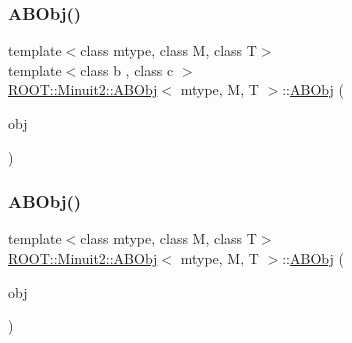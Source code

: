 \subsubsection{\texorpdfstring{ABObj()}{ABObj()}\hspace{0.1cm}{\footnotesize\ttfamily [4/12]}}
{\footnotesize\ttfamily template$<$class mtype, class M, class T$>$ \\
template$<$class b , class c $>$ \\
\mbox{\hyperlink{classROOT_1_1Minuit2_1_1ABObj}{R\+O\+O\+T\+::\+Minuit2\+::\+A\+B\+Obj}}$<$ mtype, M, T $>$\+::\mbox{\hyperlink{classROOT_1_1Minuit2_1_1ABObj}{A\+B\+Obj}} (\begin{DoxyParamCaption}\item[{const \mbox{\hyperlink{classROOT_1_1Minuit2_1_1ABObj}{A\+B\+Obj}}$<$ mtype, b, c $>$ \&}]{obj }\end{DoxyParamCaption})\hspace{0.3cm}{\ttfamily [inline]}}

\mbox{\label{classROOT_1_1Minuit2_1_1ABObj_a48561e673ca2a4a05b9e67af09b1736a}} 
\subsubsection{\texorpdfstring{ABObj()}{ABObj()}\hspace{0.1cm}{\footnotesize\ttfamily [5/12]}}
{\footnotesize\ttfamily template$<$class mtype, class M, class T$>$ \\
\mbox{\hyperlink{classROOT_1_1Minuit2_1_1ABObj}{R\+O\+O\+T\+::\+Minuit2\+::\+A\+B\+Obj}}$<$ mtype, M, T $>$\+::\mbox{\hyperlink{classROOT_1_1Minuit2_1_1ABObj}{A\+B\+Obj}} (\begin{DoxyParamCaption}\item[{const M \&}]{obj }\end{DoxyParamCaption})\hspace{0.3cm}{\ttfamily [inline]}}

\mbox{\label{classROOT_1_1Minuit2_1_1ABObj_a2406012a4e1bd70d0a92c2468eaaee7c}} 
